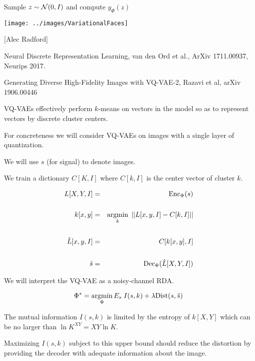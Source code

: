 {

\centerline{Sample {\color{red} $z \sim {\cal N}(0,I)$} and compute {\color{red} $y_\Phi(z)$}}

\vfill
\centerline{\texttt{[image: ../images/VariationalFaces]}}
\centerline{[Alec Radford]}


Neural Discrete Representation Learning, van den Ord et al., ArXiv 1711.00937, Neurips 2017.

\vfill
Generating Diverse High-Fidelity Images
with VQ-VAE-2, Razavi et al, arXiv 1906.00446

\vfill
VQ-VAEs effectively perform $k$-means on vectors in the model so as to represent vectors by discrete cluster centers.


\vfill
For concreteness we will consider VQ-VAEs on images with a single layer of quantization.

\vfill
We will use $s$ (for signal) to denote images.


We train a dictionary $C[K,I]$ where $C[k,I]$ is the center vector of cluster $k$.

\vfill
\begin{eqnarray*}
L[X,Y,I] & = & \mathrm{Enc}_\Phi(s) \\
\\
k[x,y] & = & \operatorname*{argmin}_k \;||L[x,y,I] - C[k,I]|| \\
\\
\hat{L}[x,y,I] & = & C[k[x,y],I] \\
\\
\hat{s} & = & \mathrm{Dec}_\Phi(\hat{L}[X,Y,I])
\end{eqnarray*}


We will interpret the VQ-VAE as a noisy-channel RDA.

$$\Phi^*  =  \operatorname*{argmin}_\Phi E_s\;I(s,k) + \lambda\mathrm{Dist}(s,\hat{s})$$

\vfill
The mutual information $I(s,k)$ is limited by the entropy of $k[X,Y]$ which can be no larger than $\ln K^{XY} = XY\ln K$.

\vfill
Maximizing $I(s,k)$ subject to this upper bound should reduce the distortion by providing the decoder with adequate information
about the image.


}
